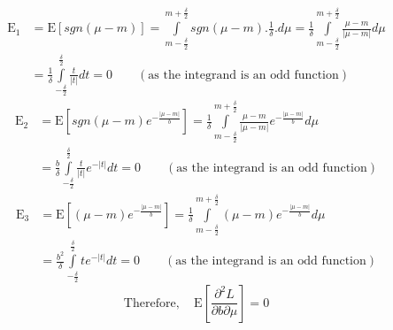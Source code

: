 \documentclass[wcp]{jmlr}
\begin{document}
\begin{align*}
 \mathrm{E}_1 &= \mathrm{E}[sgn(\mu-m)] = \int\limits_{m-\frac{\delta}{2}}^{m+\frac{\delta}{2}} sgn(\mu-m).\frac{1}{\delta}.d\mu = \frac{1}{\delta} \int\limits_{m-\frac{\delta}{2}}^{m+\frac{\delta}{2}} \frac{\mu-m}{|\mu-m|} d\mu \\
 &= \frac{1}{\delta} \int\limits_{-\frac{\delta}{2}}^{\frac{\delta}{2}} \frac{t}{|t|} dt = 0 \quad\quad(\mathrm{as\,\,the\,\,integrand\,\,is\,\,an\,\,odd\,\,function})
\end{align*}
\begin{align*}
 \mathrm{E}_2 &= \mathrm{E}[sgn(\mu-m)e^{-\frac{|\mu-m|}{b}}] = \frac{1}{\delta} \int\limits_{m-\frac{\delta}{2}}^{m+\frac{\delta}{2}} \frac{\mu-m}{|\mu-m|} e^{-\frac{|\mu-m|}{b}} d\mu \\
 &= \frac{b}{\delta} \int\limits_{-\frac{\delta}{2}}^{\frac{\delta}{2}} \frac{t}{|t|} e^{-|t|} dt = 0 \quad\quad(\mathrm{as\,\,the\,\,integrand\,\,is\,\,an\,\,odd\,\,function})
\end{align*}
\begin{align*}
 \mathrm{E}_3 &= \mathrm{E}[(\mu-m)e^{-\frac{|\mu-m|}{b}}] = \frac{1}{\delta} \int\limits_{m-\frac{\delta}{2}}^{m+\frac{\delta}{2}} (\mu-m)e^{-\frac{|\mu-m|}{b}} d\mu \\
 &= \frac{b^2}{\delta} \int\limits_{-\frac{\delta}{2}}^{\frac{\delta}{2}} t e^{-|t|} dt = 0 \quad\quad(\mathrm{as\,\,the\,\,integrand\,\,is\,\,an\,\,odd\,\,function})
\end{align*}
\begin{equation*} 
  \mathrm{Therefore,}\quad \mathrm{E} \left[\frac{\partial^2 L}{\partial b \partial \mu}\right] = 0 
\end{equation*}
\end{document}
